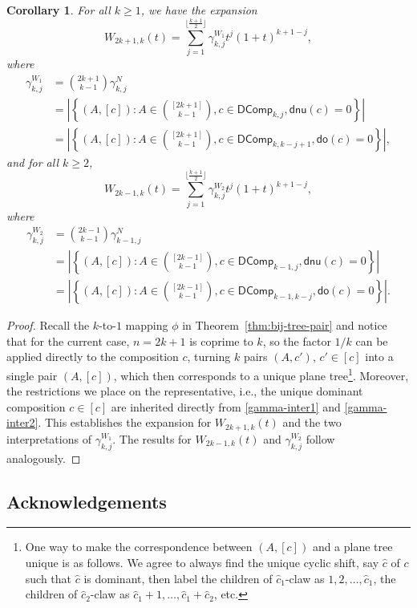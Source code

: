 \documentclass[reqno]{amsart}
\numberwithin{equation}{section}
\newtheorem{corollary}[theorem]{Corollary}
\theoremstyle{definition}
\theoremstyle{named}
\newcommand{\abs}[1]{\left|#1\right|}
\def\DComp{\mathsf{DComp}}
\def\dnu{\mathsf{dnu}}
\newcommand{\sdo}{\mathsf{do}}
\begin{document}
\begin{corollary}
For all $k\ge 1$, we have the expansion
$$W_{2k+1,k}(t)=\sum_{j=1}^{\lfloor\frac{k+1}{2}\rfloor}\gamma^{W_1}_{k,j}t^j(1+t)^{k+1-j},$$ 
where
\begin{align*}
\gamma^{W_1}_{k,j}&=\binom{2k+1}{k-1}\gamma^N_{k,j}\\
&=\abs{\left \{ (A,[c]): A \in\binom{[2k+1]}{k-1},c\in \DComp_{k,j}, \dnu(c)=0\right\}}\\
&=\abs{\left \{ (A,[c]): A \in\binom{[2k+1]}{k-1},c\in \DComp_{k,k-j+1}, \sdo(c)=0\right\}},
\end{align*}
and for all $k\ge 2$,
$$W_{2k-1,k}(t)=\sum_{j=1}^{\lfloor\frac{k+1}{2}\rfloor}\gamma^{W_2}_{k,j}t^j(1+t)^{k+1-j},$$ 
where
\begin{align*}
\gamma^{W_2}_{k,j}&=\binom{2k-1}{k-1}\gamma^N_{k-1,j}\\
&=\abs{\left \{ (A,[c]): A \in\binom{[2k-1]}{k-1},c\in \DComp_{k-1,j}, \dnu(c)=0\right\}}\\
&=\abs{\left \{ (A,[c]): A \in\binom{[2k-1]}{k-1},c\in \DComp_{k-1,k-j}, \sdo(c)=0\right\}}.
\end{align*}
\end{corollary}
\begin{proof}
Recall the $k$-to-$1$ mapping $\phi$ in Theorem~\ref{thm:bij-tree-pair} and notice that for the current case, $n=2k+1$ is coprime to $k$, so the factor $1/k$ can be applied directly to the composition $c$, turning $k$ pairs $(A,c')$, $c'\in[c]$ into a single pair $(A,[c])$, which then corresponds to a unique plane tree\footnote{One way to make the correspondence between $(A,[c])$ and a plane tree unique is as follows. We agree to always find the unique cyclic shift, say $\hat{c}$ of $c$ such that $\hat{c}$ is dominant, then label the children of $\hat{c}_1$-claw as $1,2,\ldots,\hat{c}_1$, the children of $\hat{c}_2$-claw as $\hat{c}_1+1,\ldots,\hat{c}_1+\hat{c}_2$, etc.}. Moreover, the restrictions we place on the representative, i.e., the unique dominant composition $c\in[c]$ are inherited directly from \eqref{gamma-inter1} and \eqref{gamma-inter2}. This establishes the expansion for $W_{2k+1,k}(t)$ and the two interpretations of $\gamma^{W_1}_{k,j}$. The results for $W_{2k-1,k}(t)$ and $\gamma^{W_2}_{k,j}$ follow analogously.
\end{proof}


\subsection*{Acknowledgements}
\end{document}
